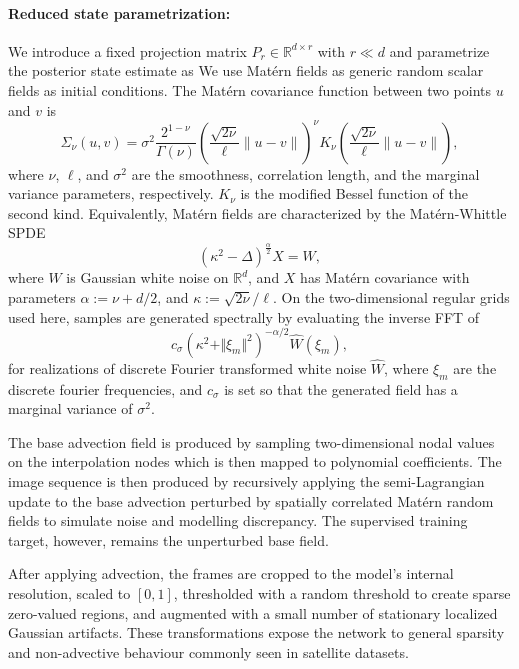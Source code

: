\documentclass[a4paper,12pt]{article}
\begin{document}
\paragraph{Reduced state parametrization:}
We introduce a fixed projection matrix $P_r \in \mathbb{R}^{d \times r}$ with $r \ll d$ and parametrize the posterior state estimate as
We use Matérn fields as generic random scalar fields as initial conditions.
The Matérn covariance function between two points $u$ and $v$ is
\begin{equation}
    \Sigma_{\nu}(u,v)
    = \sigma^2 \frac{2^{1-\nu}}{\Gamma(\nu)}
    \left(\frac{\sqrt{2\nu}}{\ell} \lVert u - v \rVert\right)^{\nu}
    K_{\nu}
    \left(\frac{\sqrt{2\nu}}{\ell} \lVert u - v \rVert \right),
\end{equation}
where $\nu$, $\ell$, and $\sigma^2$ are the smoothness, correlation length, and the marginal variance parameters, respectively.
$K_{\nu}$ is the modified Bessel function of the second kind.
Equivalently, Matérn fields are characterized by the Matérn-Whittle SPDE~\cite{whittle63,lindgren}
\begin{equation}\label{eq:maternspde}
    (\kappa^2 - \Delta)^{\frac{\alpha}{2}} X = W,
\end{equation}
where $W$ is Gaussian white noise on $\mathbb{R}^d$, and $X$ has Matérn covariance with parameters $\alpha := \nu + d/2$, and $\kappa := \sqrt{2 \nu}/\ell$.
On the two-dimensional regular grids used here, samples are generated spectrally by evaluating the inverse FFT of
\begin{equation}
    c_\sigma \left( \kappa^2 + \Vert \xi_m \Vert^2 \right)^{-\alpha/2} \widehat{W}(\xi_m),
\end{equation}
for realizations of discrete Fourier transformed white noise $\widehat{W}$, where $\xi_m$ are the discrete fourier frequencies, and $c_\sigma$ is set so that the generated field has a marginal variance of $\sigma^2$.

The base advection field is produced by sampling two-dimensional nodal values on the interpolation nodes which is then mapped to polynomial coefficients.
The image sequence is then produced by recursively applying the semi-Lagrangian update to the base advection perturbed by spatially correlated Matérn random fields to simulate noise and modelling discrepancy.
The supervised training target, however, remains the unperturbed base field.

After applying advection, the frames are cropped to the model's internal resolution, scaled to $[0,1]$, thresholded with a random threshold to create sparse zero-valued regions, and augmented with a small number of stationary localized Gaussian artifacts.
These transformations expose the network to general sparsity and non-advective behaviour commonly seen in satellite datasets.
\end{document}
